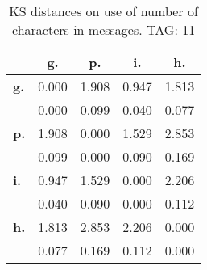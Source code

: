 \begin{table}[h!]
\begin{center}
\begin{tabular}{| l || c | c | c | c |}\hline
 & {\bf g.} & {\bf p.} & {\bf i.} & {\bf h.} \\\hline\hline
{\bf g.} & 0.000 & 1.908 & 0.947 & 1.813 \\
{\bf } & 0.000 & 0.099 & 0.040 & 0.077 \\\hline
{\bf p.} & 1.908 & 0.000 & 1.529 & 2.853 \\
{\bf } & 0.099 & 0.000 & 0.090 & 0.169 \\\hline
{\bf i.} & 0.947 & 1.529 & 0.000 & 2.206 \\
{\bf } & 0.040 & 0.090 & 0.000 & 0.112 \\\hline
{\bf h.} & 1.813 & 2.853 & 2.206 & 0.000 \\
{\bf } & 0.077 & 0.169 & 0.112 & 0.000 \\\hline
\end{tabular}
\caption{KS distances on use of number of characters in messages. TAG: 11}
\end{center}
\end{table}
